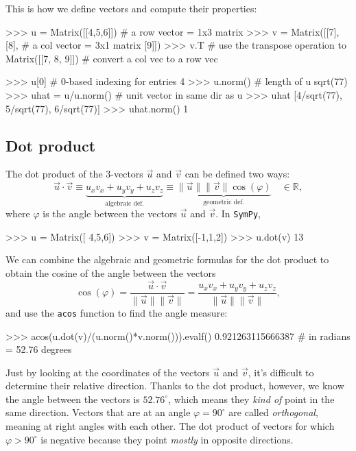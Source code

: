 This is how we define vectors and compute their properties:											
																						
\small
\begin{verbatimtab}
>>> u = Matrix([[4,5,6]]) # a row vector = 1x3 matrix
>>> v = Matrix([[7],
                [8],      # a col vector = 3x1 matrix 
                [9]])
>>> v.T                   # use the transpose operation to 
Matrix([[7, 8, 9]])       # convert a col vec to a row vec

>>> u[0]                  # 0-based indexing for entries 
4
>>> u.norm()              # length of u 
sqrt(77)
>>> uhat = u/u.norm()     # unit vector in same dir as u
>>> uhat
[4/sqrt(77), 5/sqrt(77), 6/sqrt(77)]
>>> uhat.norm()
1
\end{verbatimtab}
\normalsize




\subsection{Dot product}
\label{vectors:dot_product}

The dot product of the $3$-vectors $\vec{u}$ and $\vec{v}$ can be defined two ways:						
\[
  \vec{u}\cdot\vec{v}
  	\equiv 
	\underbrace{u_xv_x+u_yv_y+u_zv_z}_{\textrm{algebraic def.}} 
	\equiv 
	\underbrace{\|\vec{u}\|\|\vec{v}\|\cos(\varphi)}_{\textrm{geometric def.}} 
	\quad \in \mathbb{R},
\]
where $\varphi$ is the angle between the vectors $\vec{u}$ and $\vec{v}$.
In \texttt{SymPy},

\small
\begin{verbatimtab}
>>> u = Matrix([ 4,5,6])
>>> v = Matrix([-1,1,2])
>>> u.dot(v)
13
\end{verbatimtab}
\normalsize

\noindent
We can combine the algebraic and geometric formulas for the dot product
to obtain the cosine of the angle between the vectors
\[
    \cos(\varphi)
        = \frac{ \vec{u}\cdot\vec{v} }{  \|\vec{u}\|\|\vec{v}\| }
        = \frac{ u_xv_x+u_yv_y+u_zv_z  }{  \|\vec{u}\|\|\vec{v}\| },
\]
and use the \texttt{acos} function to find the angle measure:

\small
\begin{verbatimtab}
>>> acos(u.dot(v)/(u.norm()*v.norm())).evalf()
0.921263115666387      # in radians  =  52.76 degrees
\end{verbatimtab}
\normalsize

\noindent
Just by looking at the coordinates of the vectors $\vec{u}$ and $\vec{v}$,
it's difficult to determine their relative direction. 
Thanks to the dot product, however,
we know the angle between the vectors is $52.76^\circ$,
which means they \emph{kind of} point in the same direction.
Vectors that are at an angle $\varphi=90^\circ$ are called \emph{orthogonal}, meaning at right angles with each other.
The dot product of vectors for which $\varphi > 90^\circ$ is negative because they point \emph{mostly} in opposite directions.

